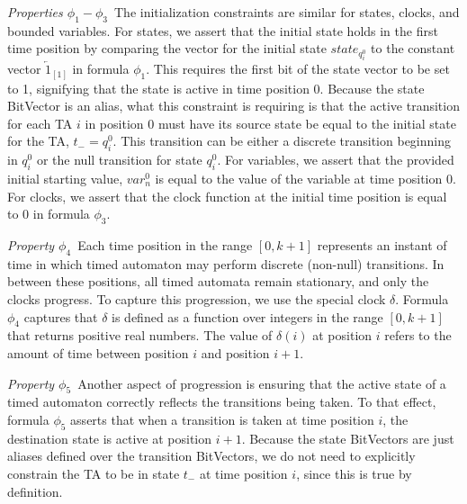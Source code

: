 \documentclass[a4paper,12pt]{article}
\begin{document}
\emph{Properties \(\phi_{1} - \phi_{3}\)}\ The initialization constraints are
similar for states, clocks, and bounded variables. For states, we assert that
the initial state holds in the first time position by comparing the vector for
the initial state \(state_{q_i^{0}}\) to the constant vector
\(\overleftarrow{1}_{[1]}\) in formula \(\phi_1\). This requires the first bit
of the state vector to be set to 1, signifying that the state is active in time
position 0. Because the state BitVector is an alias, what this constraint is
requiring is that the active transition for each TA \(i\) in position \(0\) must
have its source state be equal to the initial state for the TA,
\(t_{-} = q_{i}^{0}\). This transition can be either a discrete transition
beginning in \(q_{i}^{0}\) or the null transition for state \(q_{i}^{0}\). For
variables, we assert that the provided initial starting value, \(var_{n}^{0}\)
is equal to the value of the variable at time position 0. For clocks, we assert
that the clock function at the initial time position is equal to 0 in formula
\(\phi_3\).

\emph{Property $\phi_4$}\ Each time position in the range \([0,k+1]\) represents
an instant of time in which timed automaton may perform discrete (non-null)
transitions. In between these positions, all timed automata remain stationary,
and only the clocks progress. To capture this progression, we use the special
clock \(\delta\). Formula \(\phi_4\) captures that \(\delta\) is defined as a
function over integers in the range \([0,k+1]\) that returns positive real
numbers. The value of \(\delta(i)\) at position \(i\) refers to the amount of
time between position \(i\) and position \(i+1\).

\emph{Property $\phi_5$}\ Another aspect of progression is ensuring that the
active state of a timed automaton correctly reflects the transitions being
taken. To that effect, formula \(\phi_5\) asserts that when a transition is
taken at time position \(i\), the destination state is active at position
\(i{+}1\). Because the state BitVectors are just aliases defined over the
transition BitVectors, we do not need to explicitly constrain the TA to be in
state \(t_{-}\) at time position \(i\), since this is true by definition.
\end{document}
